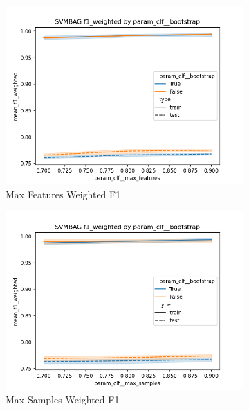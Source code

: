 \documentclass[12pt]{article}
\begin{document}
\begin{figure}
\begin{subfigure}{.5\textwidth}
      \includegraphics[width=.95\textwidth]{../../results/SVMbag/param_clf__bootstrap_f1_weighted_param_clf__max_features.png}
      \caption{Max Features Weighted F1}
      \end{subfigure}%
    \begin{subfigure}{.5\textwidth}
      \includegraphics[width=.95\textwidth]{../../results/SVMbag/param_clf__bootstrap_f1_weighted_param_clf__max_samples.png}
      \caption{Max Samples Weighted F1}
    \end{subfigure}
    \begin{subfigure}{.5\textwidth}

\end{subfigure}
\end{figure}
\end{document}
